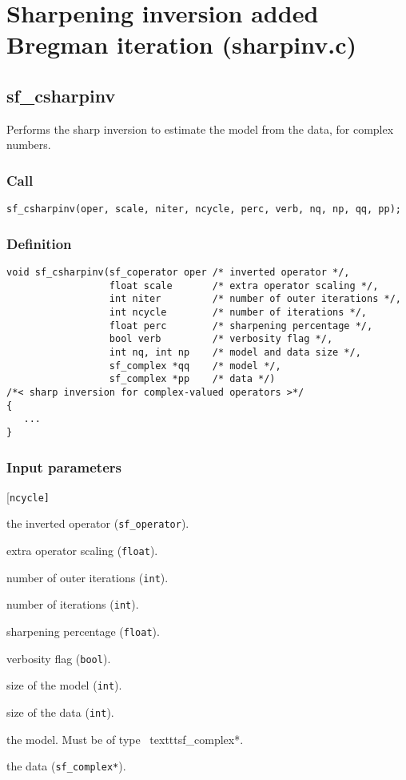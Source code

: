\section{Sharpening inversion added Bregman iteration (sharpinv.c)}




\subsection{{sf\_csharpinv}}
Performs the sharp inversion to estimate the model from the data, for complex numbers.

\subsubsection*{Call}
\begin{verbatim}
sf_csharpinv(oper, scale, niter, ncycle, perc, verb, nq, np, qq, pp);
\end{verbatim}

\subsubsection*{Definition}
\begin{verbatim}
void sf_csharpinv(sf_coperator oper /* inverted operator */, 
                  float scale       /* extra operator scaling */,
                  int niter         /* number of outer iterations */,
                  int ncycle        /* number of iterations */,
                  float perc        /* sharpening percentage */,
                  bool verb         /* verbosity flag */,
                  int nq, int np    /* model and data size */,
                  sf_complex *qq    /* model */, 
                  sf_complex *pp    /* data */)
/*< sharp inversion for complex-valued operators >*/
{
   ...
}
\end{verbatim}

\subsubsection*{Input parameters}
\begin{desclist}{\tt }{\quad}[\tt ncycle]
   \setlength\itemsep{0pt}
   \item[oper]   the inverted operator (\texttt{sf\_operator}). 
   \item[scale]  extra operator scaling (\texttt{float}). 
   \item[niter]  number of outer iterations (\texttt{int}). 
   \item[ncycle] number of iterations (\texttt{int}). 
   \item[perc]   sharpening percentage (\texttt{float}). 
   \item[verb]   verbosity flag (\texttt{bool}). 
   \item[nq]     size of the model (\texttt{int}).
   \item[np]     size of the data (\texttt{int}). 
   \item[qq]     the model. Must be of type \	texttt{sf\_complex*}.
   \item[pp]     the data (\texttt{sf\_complex*}).
\end{desclist}




